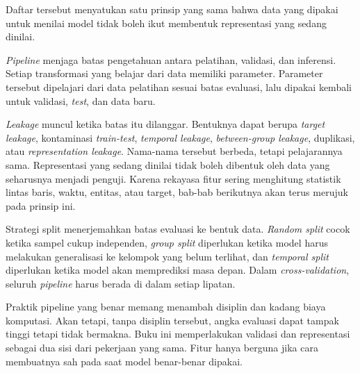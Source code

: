 Daftar tersebut menyatukan satu prinsip yang sama bahwa data yang dipakai untuk menilai model tidak boleh ikut membentuk representasi yang sedang dinilai.

\begin{sintesis}

\emph{Pipeline} menjaga batas pengetahuan antara pelatihan, validasi, dan inferensi. Setiap transformasi yang belajar dari data memiliki parameter. Parameter tersebut dipelajari dari data pelatihan sesuai batas evaluasi, lalu dipakai kembali untuk validasi, \emph{test}, dan data baru.

\emph{Leakage} muncul ketika batas itu dilanggar. Bentuknya dapat berupa \emph{target leakage}, kontaminasi \emph{train-test}, \emph{temporal leakage}, \emph{between-group leakage}, duplikasi, atau \emph{representation leakage}. Nama-nama tersebut berbeda, tetapi pelajarannya sama. Representasi yang sedang dinilai tidak boleh dibentuk oleh data yang seharusnya menjadi penguji. Karena rekayasa fitur sering menghitung statistik lintas baris, waktu, entitas, atau target, bab-bab berikutnya akan terus merujuk pada prinsip ini.

Strategi split menerjemahkan batas evaluasi ke bentuk data. \emph{Random split} cocok ketika sampel cukup independen, \emph{group split} diperlukan ketika model harus melakukan generalisasi ke kelompok yang belum terlihat, dan \emph{temporal split} diperlukan ketika model akan memprediksi masa depan. Dalam \emph{cross-validation}, seluruh \emph{pipeline} harus berada di dalam setiap lipatan.

Praktik pipeline yang benar memang menambah disiplin dan kadang biaya komputasi. Akan tetapi, tanpa disiplin tersebut, angka evaluasi dapat tampak tinggi tetapi tidak bermakna. Buku ini memperlakukan validasi dan representasi sebagai dua sisi dari pekerjaan yang sama. Fitur hanya berguna jika cara membuatnya sah pada saat model benar-benar dipakai.

\end{sintesis}

